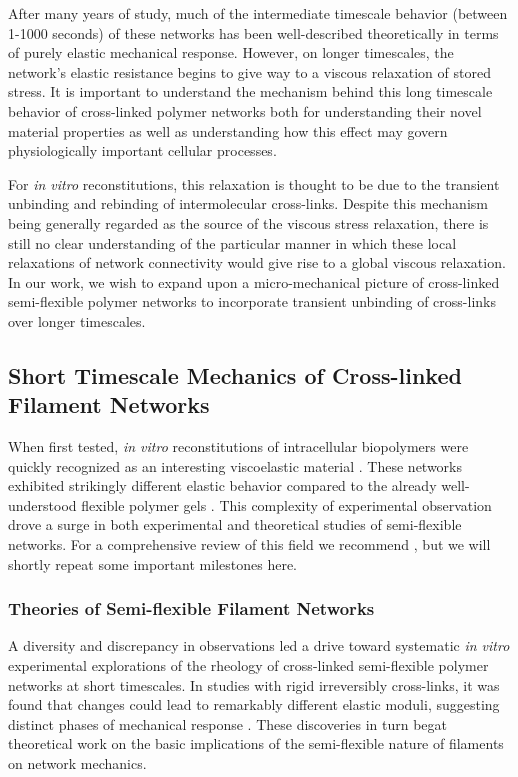 \documentclass[pre,reprint]{revtex4-1}
\begin{document}
After many years of study, much of the intermediate timescale behavior (between 1-1000 seconds) of these networks has been well-described theoretically in terms of purely elastic mechanical response.  However, on longer timescales, the network's elastic resistance begins to give way to a viscous relaxation of stored stress.   It is important to understand the mechanism behind this long timescale behavior of cross-linked polymer networks both for understanding their novel material properties as well as understanding how this effect may govern physiologically important cellular processes\cite{cell_rheo}.

For {\em in vitro} reconstitutions, this relaxation is thought to be due to the transient unbinding and rebinding of intermolecular cross-links.  Despite this mechanism being generally regarded as the source of the viscous stress relaxation, there is still no clear understanding of the particular manner in which these local relaxations of network connectivity would give rise to a global viscous relaxation.  In our work, we wish to expand upon a micro-mechanical picture of cross-linked semi-flexible polymer networks to incorporate transient unbinding of cross-links over longer timescales.  


\subsection{Short Timescale Mechanics of Cross-linked Filament Networks}

When first tested, {\em in vitro} reconstitutions of intracellular biopolymers were quickly recognized as an interesting viscoelastic material \cite{rheo_actingel}.  These networks exhibited strikingly different elastic behavior compared to the already well-understood flexible polymer gels \cite{rheo_bench}.  This complexity of experimental observation drove a surge in both experimental and theoretical studies of semi-flexible networks.  For a comprehensive review of this field we recommend \cite{megareview}, but we will shortly repeat some important milestones here.

\subsubsection{Theories of Semi-flexible Filament Networks}
 
A diversity and discrepancy in observations led a drive toward systematic {\em in vitro} experimental explorations of the rheology of cross-linked semi-flexible polymer networks at short timescales.  In studies with rigid irreversibly cross-links, it was found that changes could lead to remarkably different elastic moduli, suggesting distinct phases of mechanical response \cite{rheo_marge}.  These discoveries in turn begat theoretical work on the basic implications of the semi-flexible nature of filaments on network mechanics.  
\end{document}
